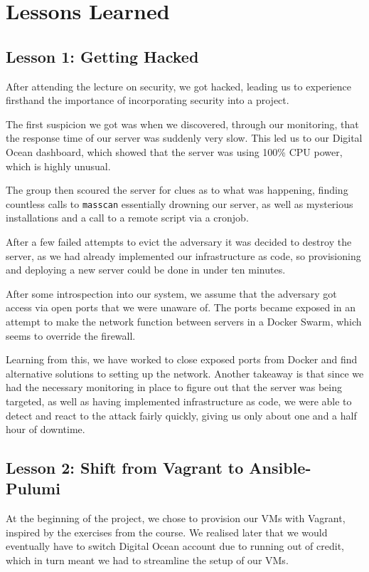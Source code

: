 \section{Lessons Learned}

\subsection{Lesson 1: Getting Hacked}
\label{section_hacked}
After attending the lecture on security, we got hacked, leading us to experience firsthand the importance of incorporating security into a project.

The first suspicion we got was when we discovered, through our monitoring, that the response time of our server was suddenly very slow. This led us to our Digital Ocean dashboard, which showed that the server was using 100\% CPU power, which is highly unusual.

The group then scoured the server for clues as to what was happening, finding countless calls to \texttt{masscan} essentially drowning our server, as well as mysterious installations and a call to a remote script via a cronjob.

After a few failed attempts to evict the adversary it was decided to destroy the server, as we had already implemented our infrastructure as code, so provisioning and deploying a new server could be done in under ten minutes.

After some introspection into our system, we assume that the adversary got access via open ports that we were unaware of. The ports became exposed in an attempt to make the network function between servers in a Docker Swarm, which seems to override the firewall.

Learning from this, we have worked to close exposed ports from Docker and find alternative solutions to setting up the network. Another takeaway is that since we had the necessary monitoring in place to figure out that the server was being targeted, as well as having implemented infrastructure as code, we were able to detect and react to the attack fairly quickly, giving us only about one and a half hour of downtime.

\subsection{Lesson 2: Shift from Vagrant to Ansible-Pulumi}
At the beginning of the project, we chose to provision our VMs with Vagrant, inspired by the exercises from the course.
We realised later that we would eventually have to switch Digital Ocean account due to running out of credit, which in turn meant we had to streamline the setup of our VMs.

